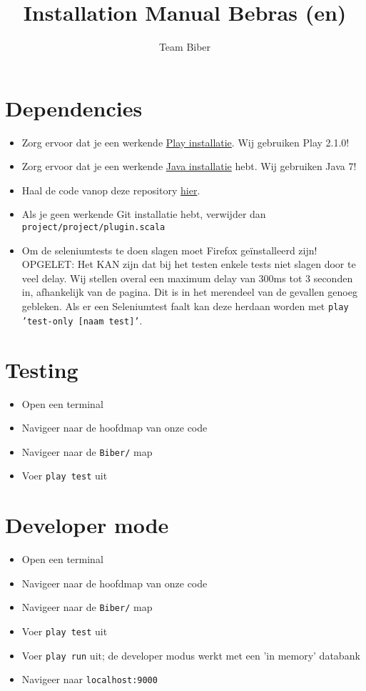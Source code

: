 \documentclass[11pt,a4paper]{article}
\title{Installation Manual Bebras (en)}
\author{Team Biber}
\begin{document}
\maketitle
\parindent 0pt

\section{Dependencies}
\begin{itemize}
\item Zorg ervoor dat je een werkende \href{http://www.playframework.com/documentation/2.1.0/Home}{Play installatie}. Wij gebruiken Play 2.1.0!
\item Zorg ervoor dat je een werkende \href{http://www.oracle.com/technetwork/java/javase/downloads/index.html}{Java installatie} hebt. Wij gebruiken Java 7!
\item Haal de code vanop deze repository \href{https://github.ugent.be/tnnaesse/Biber}{hier}.
\item Als je geen werkende Git installatie hebt, verwijder dan \texttt{project/project/plugin.scala}
\item Om de seleniumtests te doen slagen moet Firefox geïnstalleerd zijn! OPGELET: Het KAN zijn dat bij het testen enkele tests niet slagen door te veel delay. Wij stellen overal een maximum delay van 300ms tot 3 seconden in, afhankelijk van de pagina. Dit is in het merendeel van de gevallen genoeg gebleken. Als er een Seleniumtest faalt kan deze herdaan worden met \texttt{play 'test-only [naam test]'}.
\end{itemize}

\section{Testing}
\begin{itemize}
\item Open een terminal
\item Navigeer naar de hoofdmap van onze code
\item Navigeer naar de \texttt{Biber/} map
\item Voer \texttt{play test} uit
\end{itemize}

\section{Developer mode}
\begin{itemize}
\item Open een terminal
\item Navigeer naar de hoofdmap van onze code
\item Navigeer naar de \texttt{Biber/} map
\item Voer \texttt{play test} uit
\item Voer \texttt{play run} uit; de developer modus werkt met een 'in memory' databank
\item Navigeer naar \texttt{localhost:9000}
\end{itemize}
\end{document}
